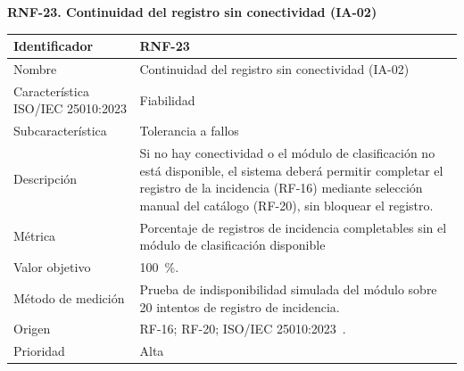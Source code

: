 \documentclass[12pt,a4paper]{article}
\begin{document}
\begin{minipage}{\linewidth}
\bigskip
\noindent\textbf{RNF-23. Continuidad del registro sin conectividad (IA-02)}
\label{tab:RNF-23}

\begin{center}
\begin{tabular}{|p{4.2cm}|p{10cm}|}
\hline
Identificador & RNF-23 \\
\hline
Nombre & Continuidad del registro sin conectividad (IA-02) \\
\hline
Característica ISO/IEC 25010:2023 & Fiabilidad \\
\hline
Subcaracterística & Tolerancia a fallos \\
\hline
Descripción & Si no hay conectividad o el módulo de clasificación no está disponible, el sistema deberá permitir completar el registro de la incidencia (RF-16) mediante selección manual del catálogo (RF-20), sin bloquear el registro. \\
\hline
Métrica & Porcentaje de registros de incidencia completables sin el módulo de clasificación disponible \\
\hline
Valor objetivo & 100~\%. \\
\hline
Método de medición & Prueba de indisponibilidad simulada del módulo sobre 20 intentos de registro de incidencia. \\
\hline
Origen & RF-16; RF-20; ISO/IEC 25010:2023~\cite{iso25010-2023}. \\
\hline
Prioridad & Alta \\
\hline
\end{tabular}
\end{center}
\end{minipage}
\end{document}
